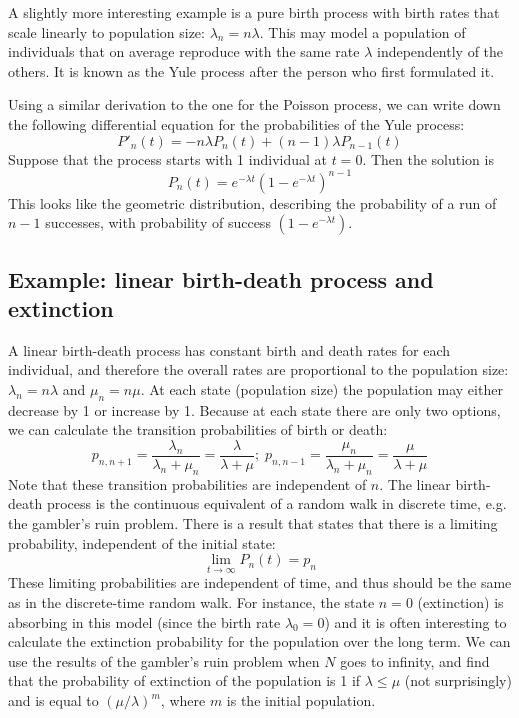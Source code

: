 \documentclass[11pt]{book}
\begin{document}
A slightly more interesting example is a pure birth process with birth rates that scale linearly to population size: $\lambda_n = n\lambda$. This may model a population of individuals that on average reproduce with the same rate $\lambda$ independently of the others. It is known as the Yule process after the person who first formulated it.

Using a similar derivation to the one for the Poisson process, we can write down the following differential equation for the probabilities of the Yule process:
$$ P'_n(t) = -n  \lambda P_n(t)  + (n-1)  \lambda P_{n-1}(t) $$
Suppose that the process starts with 1 individual at $t=0$. Then the solution is 
$$ P_n(t) = e^{-\lambda t} (1 - e^{-\lambda t})^{n-1} $$
This looks like the geometric distribution, describing the probability of a run of $n-1$ successes, with probability of success $ (1 - e^{-\lambda t})$.

\subsection{Example: linear birth-death process and extinction}
A linear birth-death process has constant birth and death rates for each individual, and therefore the overall rates are proportional to the population size:  $\lambda_n = n \lambda$ and $\mu_n = n \mu$. At each state (population size) the population may either decrease by 1 or increase by 1. Because at each state there are only two options, we can calculate the transition probabilities of birth or death: 
$$p_{n,n+1} = \frac{\lambda_n}{\lambda_n + \mu_n} = \frac{\lambda}{\lambda + \mu} ; \; p_{n,n-1} = \frac{\mu_n}{\lambda_n + \mu_n} = \frac{\mu}{\lambda + \mu}$$
Note that these transition probabilities are independent of $n$. The linear birth-death process is the continuous equivalent of a random walk in discrete time, e.g. the gambler's ruin problem. There is a result that states that there is a limiting probability, independent of the initial state:
$$ \lim_{t \rightarrow \infty} P_n(t) = p_n$$
These limiting probabilities are independent of time, and thus should be the same as in the discrete-time random walk. For instance, the state $n=0$ (extinction) is absorbing in this model (since the birth rate $\lambda_0 = 0$) and it is often interesting to calculate the extinction probability for the population over the long term. We can use the results of the gambler's ruin problem when $N$ goes to infinity, and find that the probability of extinction of the population is 1 if $\lambda \leq \mu$ (not surprisingly) and is equal to $(\mu/\lambda)^m$, where $m$ is the initial population.
\end{document}
